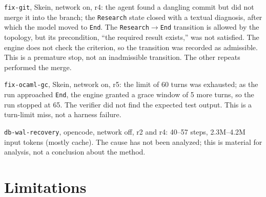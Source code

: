 \documentclass[11pt,a4paper]{article}
\begin{document}
\texttt{fix-git}, Skein, network on, r4: the agent found a dangling commit but did not merge it
into the branch; the \texttt{Research} state closed with a textual diagnosis, after which the
model moved to \texttt{End}. The \texttt{Research}$\rightarrow$\texttt{End} transition is allowed
by the topology, but its precondition,
``the required result exists,'' was not satisfied. The engine does not check the criterion, so
the transition was recorded as admissible. This is a premature stop, not an inadmissible
transition. The other repeats performed the merge.

\texttt{fix-ocaml-gc}, Skein, network on, r5: the limit of 60 turns was exhausted; as the run
approached \texttt{End}, the engine granted a grace window of 5 more turns, so the run stopped at 65. The
verifier did not find the expected test output. This is a turn-limit miss, not a harness
failure.

\texttt{db-wal-recovery}, opencode, network off, r2 and r4: 40--57 steps, 2.3M--4.2M input
tokens (mostly cache). The cause has not been analyzed; this is material for analysis, not a
conclusion about the method.

\section{Limitations}
\label{sec:limitations}
\end{document}
